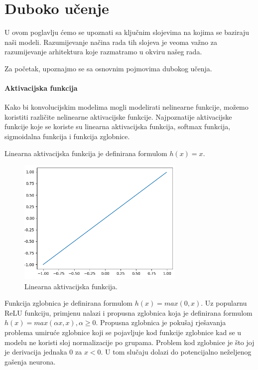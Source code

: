 \documentclass[times, utf8, diplomski,  numeric]{fer}
\begin{document}
\chapter{Duboko učenje}
U ovom poglavlju ćemo se upoznati sa ključnim slojevima na kojima se baziraju naši modeli. Razumijevanje načina rada tih slojeva je veoma važno za razumijevanje arhitektura koje razmatramo u okviru našeg rada.
\par
Za početak, upoznajmo se sa osnovnim pojmovima dubokog učenja.
\subsubsection{Aktivacijska funkcija}
Kako bi konvolucijskim modelima mogli modelirati nelinearne funkcije, možemo koristiti različite nelinearne aktivacijske funkcije. Najpoznatije aktivacijske funkcije koje se koriste su linearna aktivacijska funkcija, softmax funkcija, sigmoidalna funkcija i funkcija zglobnice.
\par
Linearna aktivacijska funkcija je definirana formulom $h(x)=x$.
\begin{figure}[htb]
\centering
\includegraphics[width=8cm]{./images/linear}
\caption{Linearna aktivacijska funkcija.}
\label{fig:linear}
\end{figure}
\par
Funkcija zglobnica  je definirana formulom $h(x)=max(0,x)$. Uz popularnu ReLU funkciju, primjenu nalazi i propusna zglobnica  koja je definirana formulom $h(x)=max(\alpha x,x), \alpha\geq 0$. Propusna zglobnica je pokušaj rješavanja problema umiruće zglobnice  koji se pojavljuje kod funkcije zglobnice kad se u modelu ne koristi sloj normalizacije po grupama. Problem kod zglobnice je što joj je derivacija jednaka 0 za $x < 0$. U tom slučaju dolazi do potencijalno neželjenog gašenja neurona.
\end{document}
